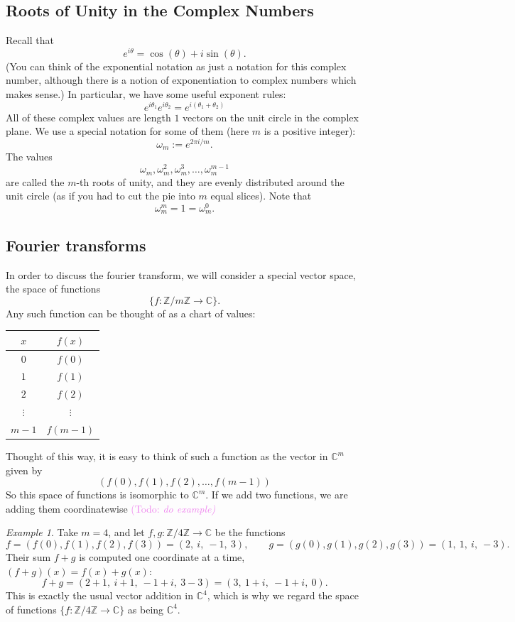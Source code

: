 \documentclass{article}
\theoremstyle{plain}
\theoremstyle{definition}
\theoremstyle{remark}
\newtheorem{example}[theorem]{Example}
\numberwithin{theorem}{section}
\newcommand{\KS}[1]{\textcolor{violet}{{\sf (Todo:} {\sl{#1})}}}
\newcommand{\KS}[1]{}
\newcommand{\ZZ}{\mathbb{Z}}
\newcommand{\CC}{\mathbb{C}}
\begin{document}
\subsection{Roots of Unity in the Complex Numbers}

Recall that 
\[
e^{i\theta} = \cos(\theta) + i \sin(\theta).
\]
(You can think of the exponential notation as just a notation for this complex number, although there is a notion of exponentiation to complex numbers which makes sense.)
In particular, we have some useful exponent rules:
\[
e^{i \theta_1}
e^{i \theta_2}=
e^{i(\theta_1 + \theta_2)}
\]
All of these complex values are length $1$ vectors on the unit circle in the complex plane.  We use a special notation for some of them (here $m$ is a positive integer):
\[
\omega_m := e^{2 \pi i/m}.
\]
The values
\[
\omega_m, \omega_m^2, \omega_m^3, \ldots, \omega_m^{m-1}
\]
are called the $m$-th roots of unity, and they are evenly distributed around the unit circle (as if you had to cut the pie into $m$ equal slices).  Note that
\[
\omega_m^m = 1 = \omega_m^0.
\]




\subsection{Fourier transforms}

In order to discuss the fourier transform, we will consider a special vector space, the space of functions
\[
\{ f \colon \ZZ/m\ZZ \rightarrow \CC \}.
\]
Any such function can be thought of as a chart of values:
\vspace{1em}

\begin{center}
\begin{tabular}{c|c}
$x$ & $f(x)$ \\
\hline
$0$ & $f(0)$ \\
$1$ & $f(1)$ \\
$2$ & $f(2)$ \\
$\vdots$ & $\vdots$ \\
$m-1$ & $f(m-1)$
\end{tabular}
\end{center}

Thought of this way, it is easy to think of such a function as the vector in $\CC^m$ given by
\[
(f(0), f(1), f(2), \ldots, f(m-1) )
\]
So this space of functions is isomorphic to $\CC^m$.  If we add two functions, we are adding them coordinatewise
\KS{do example}

\begin{example}
Take $m = 4$, and let $f, g \colon \ZZ/4\ZZ \rightarrow \CC$ be the functions
\[
f = (f(0), f(1), f(2), f(3)) = (2,\ i,\ -1,\ 3), \qquad
g = (g(0), g(1), g(2), g(3)) = (1,\ 1,\ i,\ -3).
\]
Their sum $f + g$ is computed one coordinate at a time, $(f+g)(x) = f(x) + g(x)$:
\[
f + g = (2 + 1,\ i + 1,\ -1 + i,\ 3 - 3) = (3,\ 1+i,\ -1+i,\ 0).
\]
This is exactly the usual vector addition in $\CC^4$, which is why we regard the space of functions $\{f \colon \ZZ/4\ZZ \rightarrow \CC\}$ as being $\CC^4$.
\end{example}
\end{document}
